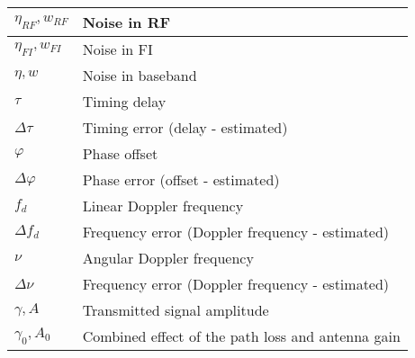 \documentclass{article}
\begin{document}
\begin{xltabular}{\textwidth}{XX}
    \(\eta_{RF}, w_{RF}\) & Noise in RF\\ \hline
    \(\eta_{FI}, w_{FI}\) & Noise in FI\\ \hline
    \(\eta, w\) & Noise in baseband\\ \hline
    \(\tau\) & Timing delay \\ \hline
    \(\Delta\tau\) & Timing error (delay - estimated) \\ \hline
    \(\varphi\) & Phase offset \\ \hline
    \(\Delta\varphi\) & Phase error (offset - estimated) \\ \hline
    \(f_d\) & Linear Doppler frequency\\ \hline
    \(\Delta f_d\) & Frequency error (Doppler frequency - estimated)\\ \hline
    \(\nu\) & Angular Doppler frequency\\ \hline
    \(\Delta \nu\) & Frequency error (Doppler frequency - estimated)\\ \hline
    \(\gamma, A\) & Transmitted signal amplitude\\ \hline
    \(\gamma_0, A_0\) & Combined effect of the path loss and antenna gain
\end{xltabular}
\end{document}
